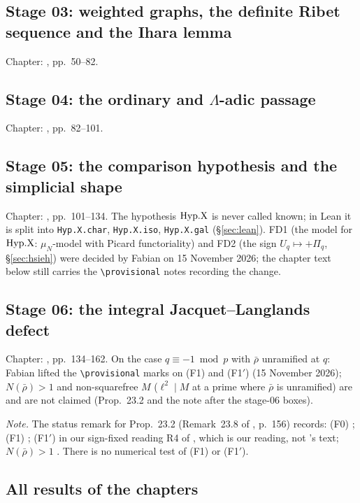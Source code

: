 \subsection{Stage 03: weighted graphs, the definite Ribet sequence and the Ihara lemma}
Chapter: \mainpdf, pp.~50--82.


\subsection{Stage 04: the ordinary and \texorpdfstring{$\Lambda$}{Lambda}-adic passage}
Chapter: \mainpdf, pp.~82--101.


\subsection{Stage 05: the comparison hypothesis and the simplicial shape}
Chapter: \mainpdf, pp.~101--134. The hypothesis $\mathrm{Hyp.X}$ is never called known; in Lean it is split into
\texttt{Hyp.X.char}, \texttt{Hyp.X.iso}, \texttt{Hyp.X.gal} (\S\ref{sec:lean}). FD1 (the model for $\mathrm{Hyp.X}$:
$\mu_N$-model with Picard functoriality) and FD2 (the sign $U_q\mapsto+\Pi_q$, \S\ref{sec:hsieh}) were decided by Fabian
on 15 November 2026; the chapter text below still carries the \verb|\provisional| notes recording the change.


\subsection{Stage 06: the integral Jacquet--Langlands defect}
Chapter: \mainpdf, pp.~134--162. On the case $q\equiv-1\bmod p$ with $\bar\rho$ unramified at $q$: Fabian lifted the
\verb|\provisional| marks on (F1) and (F1$'$) (15 November 2026); $N(\bar\rho)>1$ and non-squarefree $M$ ($\ell^2\mid M$ at a prime where $\bar\rho$ is unramified) are \stopen{} and are not claimed
(Prop.~23.2 and the note after the stage-06 boxes).

\noindent\emph{Note.} The status remark for Prop.~23.2 (Remark~23.8 of \mainpdf, p.~156) records: (F0) \stpmc; (F1) \stpmc; (F1$'$) \stpmc{} in our sign-fixed reading R4 of \cite[Thm~3.14]{KO},
which is our reading, not \cite{KO}'s text; $N(\bar\rho)>1$ \stopen. There is no numerical test of (F1) or (F1$'$).

\subsection{All results of the chapters}
{\small
}
